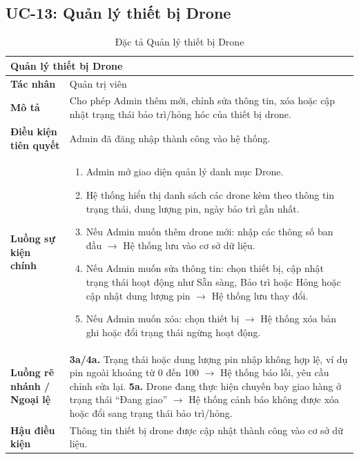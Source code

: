 \subsection{UC-13: Quản lý thiết bị Drone}
\begin{table}[H]
  \centering
  \begin{tabularx}{\textwidth}{|l|X|}
    \hline
    \multicolumn{2}{|l|}{\textbf{Quản lý thiết bị Drone}} \\
    \hline
    \textbf{Tác nhân}           & Quản trị viên \\ \hline
    \textbf{Mô tả}              & Cho phép Admin thêm mới, chỉnh sửa thông tin, xóa hoặc cập nhật trạng thái bảo trì/hỏng hóc của thiết bị drone. \\ \hline
    \textbf{Điều kiện tiên quyết} & Admin đã đăng nhập thành công vào hệ thống. \\ \hline
    \textbf{Luồng sự kiện chính} &
      \begin{enumerate}[leftmargin=*, nosep, topsep=0pt]
        \item Admin mở giao diện quản lý danh mục Drone.
        \item Hệ thống hiển thị danh sách các drone kèm theo thông tin trạng thái, dung lượng pin, ngày bảo trì gần nhất.
        \item Nếu Admin muốn thêm drone mới: nhập các thông số ban đầu $\rightarrow$ Hệ thống lưu vào cơ sở dữ liệu.
        \item Nếu Admin muốn sửa thông tin: chọn thiết bị, cập nhật trạng thái hoạt động như Sẵn sàng, Bảo trì hoặc Hỏng hoặc cập nhật dung lượng pin $\rightarrow$ Hệ thống lưu thay đổi.
        \item Nếu Admin muốn xóa: chọn thiết bị $\rightarrow$ Hệ thống xóa bản ghi hoặc đổi trạng thái ngừng hoạt động.
      \end{enumerate} \\ \hline
    \textbf{Luồng rẽ nhánh / Ngoại lệ} &
      \textbf{3a/4a.} Trạng thái hoặc dung lượng pin nhập không hợp lệ, ví dụ pin ngoài khoảng từ 0 đến 100 $\rightarrow$ Hệ thống báo lỗi, yêu cầu chỉnh sửa lại.
      \newline
      \textbf{5a.} Drone đang thực hiện chuyến bay giao hàng ở trạng thái ``Đang giao'' $\rightarrow$ Hệ thống cảnh báo không được xóa hoặc đổi sang trạng thái bảo trì/hỏng. \\ \hline
    \textbf{Hậu điều kiện}      & Thông tin thiết bị drone được cập nhật thành công vào cơ sở dữ liệu. \\
    \hline
  \end{tabularx}
  \caption{Đặc tả Quản lý thiết bị Drone}
  \label{tab:uc13}
\end{table}

